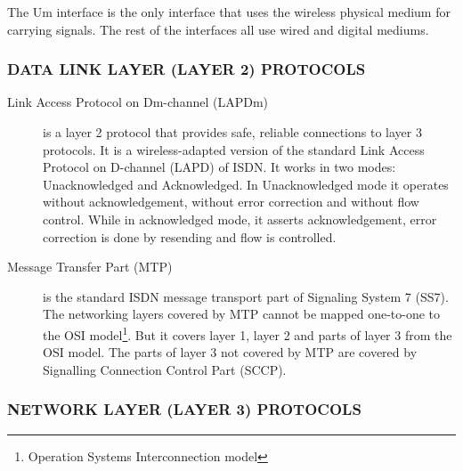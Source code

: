 The Um interface is the only interface that uses the wireless physical medium for carrying signals. The rest of the interfaces all use wired and digital mediums.

\subsubsection{\uppercase{Data Link Layer (Layer 2) protocols}}

\begin{description}
 \item [Link Access Protocol on Dm-channel (LAPDm)] is a layer 2 protocol that provides safe, reliable connections to layer 3 protocols. It is a wireless-adapted version of 
 the standard Link Access Protocol on D-channel (LAPD) of ISDN. It works in two modes: Unacknowledged and Acknowledged. In Unacknowledged mode it operates without acknowledgement,
 without error correction and without flow control. While in acknowledged mode, it asserts acknowledgement, error correction is done by resending and flow is controlled.
 \item [Message Transfer Part (MTP)] is the standard ISDN message transport part of Signaling System 7 (SS7). The networking layers covered by MTP cannot be mapped
 one-to-one to the OSI model\footnote{Operation Systems Interconnection model}. But it covers layer 1, layer 2 and parts of layer 3 from the OSI model. The parts of layer 3
 not covered by MTP are covered by Signalling Connection Control Part (SCCP).
\end{description}

\subsubsection{\uppercase{Network Layer (Layer 3) protocols}}

